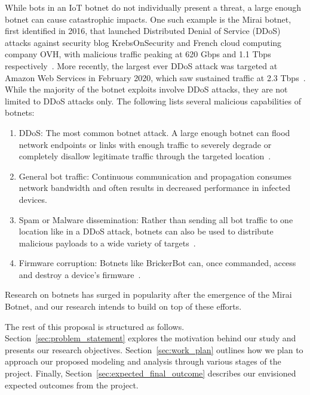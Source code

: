 While bots in an IoT botnet do not individually present a threat, a large enough botnet can cause catastrophic impacts. One such example is the Mirai botnet, first identified in 2016, that launched Distributed Denial of Service (DDoS) attacks against security blog KrebsOnSecurity and French cloud computing company OVH, with malicious traffic peaking at 620 Gbps and 1.1 Tbps respectively~\cite{kolias2017_Mirai_DDoS}. More recently, the largest ever DDoS attack was targeted at Amazon Web Services in February 2020, which saw sustained traffic at 2.3 Tbps~\cite{cloudflare_DDoS}. While the majority of the botnet exploits involve DDoS attacks, they are not limited to DDoS attacks only. The following lists several malicious capabilities of botnets:
\begin{enumerate}
    \item DDoS: The most common botnet attack. A large enough botnet can flood network endpoints or links with enough traffic to severely degrade or completely disallow legitimate traffic through the targeted location~\cite{silva2013_Botnet_Survey}.
    \item General bot traffic: Continuous communication and propagation consumes network bandwidth and often results in decreased performance in infected devices.
    \item Spam or Malware dissemination: Rather than sending all bot traffic to one location like in a DDoS attack, botnets can also be used to distribute malicious payloads to a wide variety of targets~\cite{silva2013_Botnet_Survey}.
    \item Firmware corruption: Botnets like BrickerBot can, once commanded, access and destroy a device's firmware~\cite{kolias2017_Mirai_DDoS}.
\end{enumerate}
Research on botnets has surged in popularity after the emergence of the Mirai Botnet, and our research intends to build on top of these efforts.

The rest of this proposal is structured as follows. Section~\ref{sec:problem_statement} explores the motivation behind our study and presents our research objectives. Section~\ref{sec:work_plan} outlines how we plan to approach our proposed modeling and analysis through various stages of the project. Finally, Section~\ref{sec:expected_final_outcome} describes our envisioned expected outcomes from the project.
